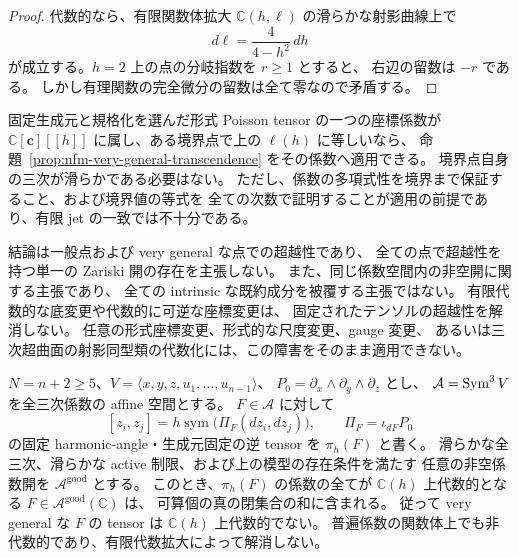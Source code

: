 \begin{proof}
代数的なら、有限関数体拡大 $\mathbb C(h,\ell)$ の滑らかな射影曲線上で
\[
 d\ell=\frac{4}{4-h^2}\,dh
\]
が成立する。$h=2$ 上の点の分岐指数を $r\ge1$ とすると、
右辺の留数は $-r$ である。
しかし有理関数の完全微分の留数は全て零なので矛盾する。
\end{proof}

\begin{remark}[固定された規格化への適用範囲]
固定生成元と規格化を選んだ形式 Poisson tensor の一つの座標係数が
$\mathbb C[\mathbf c][[h]]$ に属し、ある境界点で上の $\ell(h)$ に等しいなら、
命題~\ref{prop:nfm-very-general-transcendence} をその係数へ適用できる。
境界点自身の三次が滑らかである必要はない。
ただし、係数の多項式性を境界まで保証すること、および境界値の等式を
全ての次数で証明することが適用の前提であり、有限 jet の一致では不十分である。

結論は一般点および very general な点での超越性であり、
全ての点で超越性を持つ単一の Zariski 開の存在を主張しない。
また、同じ係数空間内の非空開に関する主張であり、
全ての intrinsic な既約成分を被覆する主張ではない。
有限代数的な底変更や代数的に可逆な座標変更は、
固定されたテンソルの超越性を解消しない。
任意の形式座標変更、形式的な尺度変更、gauge 変更、
あるいは三次超曲面の射影同型類の代数化には、この障害をそのまま適用できない。
\end{remark}


\begin{theorem}
\label{thm:nfm-normalized-tensor-transcendence}
$N=n+2\ge5$、$V=\langle x,y,z,u_1,\ldots,u_{n-1}\rangle$、
$P_0=\partial_x\wedge\partial_y\wedge\partial_z$ とし、
$\mathcal A=\operatorname{Sym}^3V$ を全三次係数の affine 空間とする。
$F\in\mathcal A$ に対して
\[
 [z_i,z_j]=h\operatorname{sym}\bigl(\Pi_F(dz_i,dz_j)\bigr),
 \qquad \Pi_F=\iota_{dF}P_0
\]
の固定 harmonic-angle・生成元固定の逆 tensor を $\pi_h(F)$ と書く。
滑らかな全三次、滑らかな active 制限、および上の模型の存在条件を満たす
任意の非空係数開を $\mathcal A^{\mathrm{good}}$ とする。
このとき、$\pi_h(F)$ の係数の全てが $\mathbb C(h)$ 上代数的となる
$F\in\mathcal A^{\mathrm{good}}(\mathbb C)$ は、
可算個の真の閉集合の和に含まれる。
従って very general な $F$ の tensor は $\mathbb C(h)$ 上代数的でない。
普遍係数の関数体上でも非代数的であり、有限代数拡大によって解消しない。
\end{theorem}

